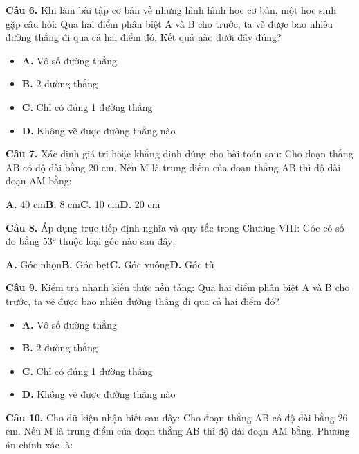 \documentclass[11pt,a4paper]{article}
\begin{document}
\textbf{\color{primary} Câu 6.} Khi làm bài tập cơ bản về những hình hình học cơ bản, một học sinh gặp câu hỏi: Qua hai điểm phân biệt A và B cho trước, ta vẽ được bao nhiêu đường thẳng đi qua cả hai điểm đó. Kết quả nào dưới đây đúng?\par
\begin{itemize}\setlength{\itemsep}{1pt}\setlength{\parskip}{0pt}
  \item[] \textbf{A.} Vô số đường thẳng
  \item[] \textbf{B.} 2 đường thẳng
  \item[] \textbf{C.} Chỉ có đúng 1 đường thẳng
  \item[] \textbf{D.} Không vẽ được đường thẳng nào
\end{itemize}\vspace{2pt}
\textbf{\color{primary} Câu 7.} Xác định giá trị hoặc khẳng định đúng cho bài toán sau: Cho đoạn thẳng AB có độ dài bằng 20 cm. Nếu M là trung điểm của đoạn thẳng AB thì độ dài đoạn AM bằng:\par
\hspace*{1.5em}\textbf{A.} 40 cm\quad\quad \textbf{B.} 8 cm\quad\quad \textbf{C.} 10 cm\quad\quad \textbf{D.} 20 cm\par\vspace{2pt}
\textbf{\color{primary} Câu 8.} Áp dụng trực tiếp định nghĩa và quy tắc trong Chương VIII: Góc có số đo bằng 53° thuộc loại góc nào sau đây:\par
\hspace*{1.5em}\textbf{A.} Góc nhọn\quad\quad \textbf{B.} Góc bẹt\quad\quad \textbf{C.} Góc vuông\quad\quad \textbf{D.} Góc tù\par\vspace{2pt}
\textbf{\color{primary} Câu 9.} Kiểm tra nhanh kiến thức nền tảng: Qua hai điểm phân biệt A và B cho trước, ta vẽ được bao nhiêu đường thẳng đi qua cả hai điểm đó?\par
\begin{itemize}\setlength{\itemsep}{1pt}\setlength{\parskip}{0pt}
  \item[] \textbf{A.} Vô số đường thẳng
  \item[] \textbf{B.} 2 đường thẳng
  \item[] \textbf{C.} Chỉ có đúng 1 đường thẳng
  \item[] \textbf{D.} Không vẽ được đường thẳng nào
\end{itemize}\vspace{2pt}
\textbf{\color{primary} Câu 10.} Cho dữ kiện nhận biết sau đây: Cho đoạn thẳng AB có độ dài bằng 26 cm. Nếu M là trung điểm của đoạn thẳng AB thì độ dài đoạn AM bằng. Phương án chính xác là:\par
\end{document}
